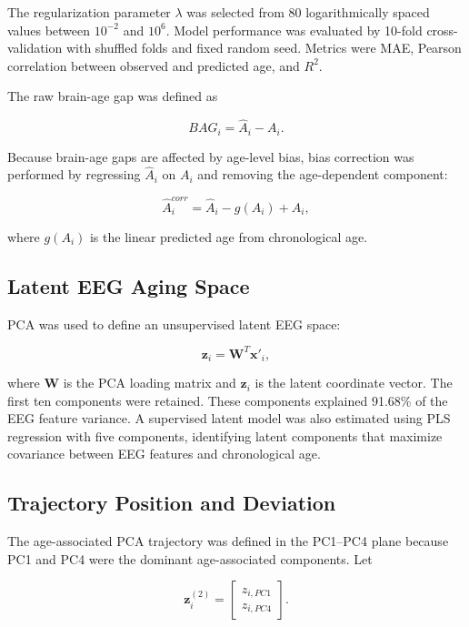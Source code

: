 \documentclass[journal]{IEEEtran}
\begin{document}
The regularization parameter $\lambda$ was selected from 80 logarithmically spaced values between $10^{-2}$ and $10^6$. Model performance was evaluated by 10-fold cross-validation with shuffled folds and fixed random seed. Metrics were MAE, Pearson correlation between observed and predicted age, and $R^2$.

The raw brain-age gap was defined as

\begin{equation}
BAG_i = \hat{A}_i - A_i.
\end{equation}

Because brain-age gaps are affected by age-level bias, bias correction was performed by regressing $\hat{A}_i$ on $A_i$ and removing the age-dependent component:

\begin{equation}
\hat{A}^{corr}_i =
\hat{A}_i - g(A_i) + A_i,
\end{equation}

where $g(A_i)$ is the linear predicted age from chronological age.

\subsection{Latent EEG Aging Space}

PCA was used to define an unsupervised latent EEG space:

\begin{equation}
\mathbf{z}_i = \mathbf{W}^{T}\mathbf{x}'_i,
\end{equation}

where $\mathbf{W}$ is the PCA loading matrix and $\mathbf{z}_i$ is the latent coordinate vector. The first ten components were retained. These components explained 91.68\% of the EEG feature variance. A supervised latent model was also estimated using PLS regression with five components, identifying latent components that maximize covariance between EEG features and chronological age.

\subsection{Trajectory Position and Deviation}

The age-associated PCA trajectory was defined in the PC1--PC4 plane because PC1 and PC4 were the dominant age-associated components. Let

\begin{equation}
\mathbf{z}_i^{(2)} =
\begin{bmatrix}
z_{i,PC1}\\
z_{i,PC4}
\end{bmatrix}.
\end{equation}
\end{document}
